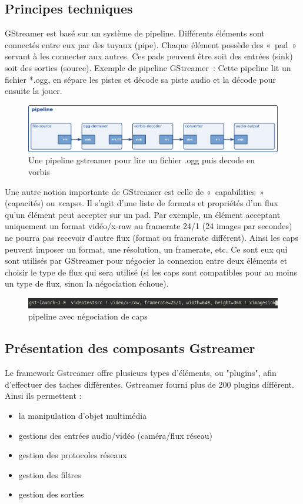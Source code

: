\subsection{Principes techniques}
GStreamer est basé sur un système de pipeline. Différents éléments sont connectés entre eux par des tuyaux (pipe). Chaque élément possède des « pad » servant à les connecter aux autres. Ces pads peuvent être soit des entrées (sink) soit des sorties (source).
Exemple de pipeline GStreamer :
Cette pipeline lit un fichier *.ogg, en sépare les pistes et décode sa piste audio et la décode pour ensuite la jouer.

\begin{figure}[!h]
  \centering
  \includegraphics[scale=0.5]{figures/pipeline_ogg}
  \caption{Une pipeline gstreamer pour lire un fichier .ogg puis decode en vorbis}
\end{figure}

Une autre notion importante de GStreamer est celle de « capabilities » (capacités) ou «caps». Il s'agit d'une liste de formats et propriétés d’un flux qu'un élément peut accepter sur un pad. Par exemple, un élément acceptant uniquement un format vidéo/x-raw au framerate 24/1 (24 images par secondes) ne pourra pas recevoir d'autre flux (format ou framerate différent). Ainsi les caps peuvent imposer un format, une résolution, un framerate, etc. Ce sont eux qui sont utilisés par GStreamer pour négocier la connexion entre deux éléments et choisir le type de flux qui sera utilisé (si les caps sont compatibles pour au moins un type de flux, sinon la négociation échoue).

\begin{figure}[!h]
  \centering
  \includegraphics[scale=0.9]{figures/caps_negociation}
  \caption{pipeline avec négociation de caps}
\end{figure}

\subsection{Présentation des composants Gstreamer}
Le framework Gstreamer offre plusieurs types d'éléments, ou "plugins", afin d'effectuer des taches différentes. Gstreamer fourni plus de 200 plugins différent. Ainsi ils permettent :
\begin{itemize}[label=$\bullet$]
 \item la manipulation d’objet multimédia
 \item gestions des entrées audio/vidéo (caméra/flux réseau)
 \item gestion des protocoles réseaux
 \item gestion des filtres
 \item gestion des sorties
\end{itemize}

